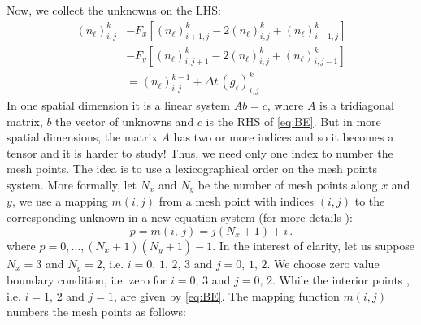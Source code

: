 Now, we collect the unknowns on the LHS:
\begin{align}
\left(n_{\ell}\right)_{i,j}^{k} & -F_{x}\left[\left(n_{\ell}\right)_{i+1,j}^{k}-2\left(n_{\ell}\right)_{i,j}^{k}+\left(n_{\ell}\right)_{i-1,j}^{k}\right]\nonumber \\
 & -F_{y}\left[\left(n_{\ell}\right)_{i,j+1}^{k}-2\left(n_{\ell}\right)_{i,j}^{k}+\left(n_{\ell}\right)_{i,j-1}^{k}\right]\nonumber \\
 & =\left(n_{\ell}\right)_{i,j}^{k-1}+\Delta t\,\left(g_{\ell}\right)_{i,j}^{k}\,.\label{eq:BE}
\end{align}
 In one spatial dimension it is a linear system $Ab=c$, where $A$
is a tridiagonal matrix, $b$ the vector of unknowns and $c$ is the
RHS of \ref{eq:BE}. But in more spatial dimensions, the matrix $A$
has two or more indices and so it becomes a tensor and it is harder
to study! Thus, we need only one index to number the mesh points.
The idea is to use a lexicographical order on the mesh points system.
More formally, let $N_{x}$ and $N_{y}$ be the number of mesh points
along $x$ and $y$, we use a mapping $m\left(i,j\right)$ from a
mesh point with indices $\left(i,j\right)$ to the corresponding unknown
in a new equation system (for more details \cite{langtangen_finite_nodate}):
\[
p=m\left(i,\,j\right)=j\left(N_{x}+1\right)+i\,.
\]
where $p=0,\ldots,\left(N_{x}+1\right)\left(N_{y}+1\right)-1$. In
the interest of clarity, let us suppose $N_{x}=3$ and $N_{y}=2$,
i.e. $i=0,\,1,\,2,\,3$ and $j=0,\,1,\,2$. We choose zero value boundary
condition, i.e. zero for $i=0,\,3$ and $j=0,\,2$. While the interior
points , i.e. $i=1,\,2$ and $j=1$, are given by \ref{eq:BE}. The
mapping function $m\left(i,j\right)$ numbers the mesh points as follows:

